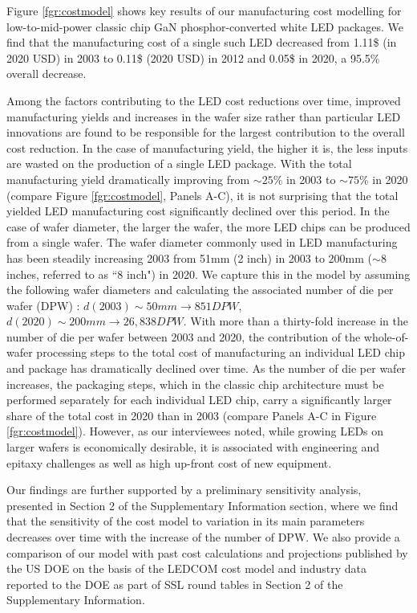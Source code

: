 \documentclass[twoside,twocolumn,9pt]{article}
\begin{document}
Figure \ref{fgr:costmodel} shows key results of our manufacturing cost modelling for low-to-mid-power classic chip GaN phosphor-converted white LED packages. We find that the manufacturing cost of a single such LED decreased from 1.11\$ (in 2020 USD) in 2003 to 0.11\$ (2020 USD) in 2012 and 0.05\$ in 2020, a 95.5\% overall decrease.

Among the factors contributing to the LED cost reductions over time, improved manufacturing yields and increases in the wafer size rather than particular LED innovations are found to be responsible for the largest contribution to the overall cost reduction. In the case of manufacturing yield, the higher it is, the less inputs are wasted on the production of a single LED package. With the total manufacturing yield dramatically improving from $\sim25\%$ in 2003 to $\sim75\%$ in 2020 (compare Figure \ref{fgr:costmodel}, Panels A-C), it is not surprising that the total yielded LED manufacturing cost significantly declined over this period. In the case of wafer diameter, the larger the wafer, the more LED chips can be produced from a single wafer. The wafer diameter commonly used in LED manufacturing has been steadily increasing 2003 from 51mm (2 inch) in 2003 to 200mm ($\sim$8 inches, referred to as “8 inch") in 2020. We capture this in the model by assuming the following wafer diameters and calculating the associated number of die per wafer (DPW) \cite{de2005investigation}: $d(2003)\sim 50 mm \rightarrow851 DPW$, $d(2020)\sim200 mm \rightarrow 26,838 DPW$. With more than a thirty-fold increase in the number of die per wafer between 2003 and 2020, the contribution of the whole-of-wafer processing steps to the total cost of manufacturing an individual LED chip and package has dramatically declined over time. As the number of die per wafer increases, the packaging steps, which in the classic chip architecture must be performed separately for each individual LED chip, carry a significantly larger share of the total cost in 2020 than in 2003 (compare Panels A-C in Figure \ref{fgr:costmodel}). However, as our interviewees noted, while growing LEDs on larger wafers is economically desirable, it is associated with engineering and epitaxy challenges as well as high up-front cost of new equipment.

Our findings are further supported by a preliminary sensitivity analysis, presented in Section 2 of the Supplementary Information section, where we find that the sensitivity of the cost model to variation in its main parameters decreases over time with the increase of the number of DPW. We also provide a comparison of our model with past cost calculations and projections published by the US DOE on the basis of the LEDCOM cost model\cite{ledcomv2} and industry data reported to the DOE as part of SSL round tables\cite{doe2010solid}\cite{doe2011solid}\cite{doe2012solid}\cite{doe2013solid}\cite{doe2014solid}\cite{doe2015solid}\cite{doe2016solid} in Section 2 of the Supplementary Information.
\end{document}
